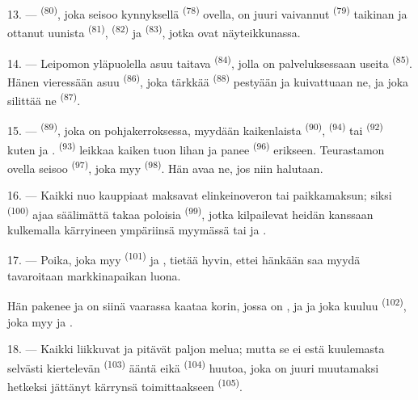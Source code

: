 13. ---  \textsuperscript{(80)}, joka seisoo kynnyksellä
 \textsuperscript{(78)} ovella, on juuri vaivannut
 \textsuperscript{(79)} taikinan ja ottanut uunista
 \textsuperscript{(81)}, 
\textsuperscript{(82)} ja  \textsuperscript{(83)}, jotka
ovat näyteikkunassa.

14. --- Leipomon yläpuolella asuu taitava 
\textsuperscript{(84)}, jolla on palveluksessaan useita 
\textsuperscript{(85)}. Hänen vieressään asuu 
\textsuperscript{(86)}, joka tärkkää 
\textsuperscript{(88)} pestyään ja kuivattuaan ne, ja joka silittää ne
 \textsuperscript{(87)}.

\VUsaut{4.0mm}
\VUsaut{3.0mm}

15. ---  \textsuperscript{(89)}, joka on pohjakerroksessa,
myydään kaikenlaista  \textsuperscript{(90)},
 \textsuperscript{(94)} tai 
\textsuperscript{(92)} kuten  ja
.  \textsuperscript{(93)} leikkaa
kaiken tuon lihan ja panee  \textsuperscript{(96)} erikseen.
Teurastamon ovella seisoo  \textsuperscript{(97)},
joka myy  \textsuperscript{(98)}. Hän avaa ne, jos niin
halutaan.

16. --- Kaikki nuo kauppiaat maksavat elinkeinoveron tai paikkamaksun; siksi
 \textsuperscript{(100)} ajaa säälimättä takaa
poloisia  \textsuperscript{(99)}, jotka
kilpailevat heidän kanssaan kulkemalla kärryineen ympäriinsä myymässä
 tai  ja .

\VUsaut{4.0mm}
\VUsaut{3.0mm}

17. --- Poika, joka myy  \textsuperscript{(101)} ja
, tietää hyvin, ettei hänkään saa myydä tavaroitaan
markkinapaikan luona.

Hän pakenee ja on siinä vaarassa kaataa korin, jossa on ,
 ja  ja joka kuuluu
 \textsuperscript{(102)}, joka myy  ja
.

18. --- Kaikki liikkuvat ja pitävät paljon melua; mutta se ei estä kuulemasta
selvästi kiertelevän  \textsuperscript{(103)} ääntä eikä
 \textsuperscript{(104)} huutoa, joka on juuri
muutamaksi hetkeksi jättänyt kärrynsä toimittaakseen  \textsuperscript{(105)}.

\VUsaut{6.0mm}
\VUfilet{22mm}
